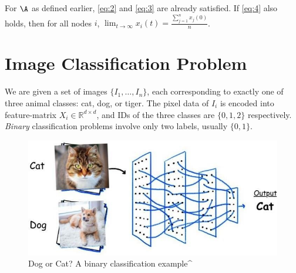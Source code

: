 \documentclass[12pt]{article}
\begin{document}
\noindent For $\A$ as defined earlier, \eqref{eq:2} and \eqref{eq:3} are already satisfied. If \eqref{eq:4} also holds, then for all nodes $i$, $\lim_{t\to \infty} x_i(t) = \frac{\sum_{j=1}^{n} x_j(0)}{n}$.


%
%
%


\section{Image Classification Problem}


We are given a set of images $\{I_1, \dots, I_n\}$, each corresponding to exactly one of three animal classes: cat, dog, or tiger. The pixel data of $I_i$ is encoded into feature-matrix $X_i \in \mathbb{R}^{d\times d}$, and IDs of the three classes are $\{0,1,2\}$ respectively. \textit{Binary} classification problems involve only two labels, usually $\{0,1\}$.
\\
\begin{figure}[h]

\centering
\includegraphics[scale=0.5]{classification.png}
\caption{Dog or Cat? A binary classification example^\cite{binaryclassification}}
\end{figure}
\end{document}
